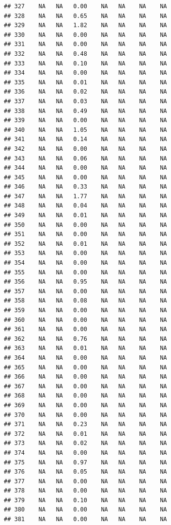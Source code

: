 \documentclass{article}\usepackage{graphicx, color}
\makeatletter
\newenvironment{kframe}{%
 \def\at@end@of@kframe{}%
 \ifinner\ifhmode%
  \def\at@end@of@kframe{\end{minipage}}%
  \begin{minipage}{\columnwidth}%
 \fi\fi%
 \def\FrameCommand##1{\hskip\@totalleftmargin \hskip-\fboxsep
 \colorbox{shadecolor}{##1}\hskip-\fboxsep
     \hskip-\linewidth \hskip-\@totalleftmargin \hskip\columnwidth}%
 \MakeFramed {\advance\hsize-\width
   \@totalleftmargin\z@ \linewidth\hsize
   \@setminipage}}%
 {\par\unskip\endMakeFramed%
 \at@end@of@kframe}
\newenvironment{knitrout}{}{} %
\makeatother
\begin{document}
\begin{knitrout}
\begin{kframe}
\begin{verbatim}
## 327    NA   NA   0.00    NA   NA    NA    NA
## 328    NA   NA   0.65    NA   NA    NA    NA
## 329    NA   NA   1.82    NA   NA    NA    NA
## 330    NA   NA   0.00    NA   NA    NA    NA
## 331    NA   NA   0.00    NA   NA    NA    NA
## 332    NA   NA   0.48    NA   NA    NA    NA
## 333    NA   NA   0.10    NA   NA    NA    NA
## 334    NA   NA   0.00    NA   NA    NA    NA
## 335    NA   NA   0.01    NA   NA    NA    NA
## 336    NA   NA   0.02    NA   NA    NA    NA
## 337    NA   NA   0.03    NA   NA    NA    NA
## 338    NA   NA   0.49    NA   NA    NA    NA
## 339    NA   NA   0.00    NA   NA    NA    NA
## 340    NA   NA   1.05    NA   NA    NA    NA
## 341    NA   NA   0.14    NA   NA    NA    NA
## 342    NA   NA   0.00    NA   NA    NA    NA
## 343    NA   NA   0.06    NA   NA    NA    NA
## 344    NA   NA   0.00    NA   NA    NA    NA
## 345    NA   NA   0.00    NA   NA    NA    NA
## 346    NA   NA   0.33    NA   NA    NA    NA
## 347    NA   NA   1.77    NA   NA    NA    NA
## 348    NA   NA   0.04    NA   NA    NA    NA
## 349    NA   NA   0.01    NA   NA    NA    NA
## 350    NA   NA   0.00    NA   NA    NA    NA
## 351    NA   NA   0.00    NA   NA    NA    NA
## 352    NA   NA   0.01    NA   NA    NA    NA
## 353    NA   NA   0.00    NA   NA    NA    NA
## 354    NA   NA   0.00    NA   NA    NA    NA
## 355    NA   NA   0.00    NA   NA    NA    NA
## 356    NA   NA   0.95    NA   NA    NA    NA
## 357    NA   NA   0.00    NA   NA    NA    NA
## 358    NA   NA   0.08    NA   NA    NA    NA
## 359    NA   NA   0.00    NA   NA    NA    NA
## 360    NA   NA   0.00    NA   NA    NA    NA
## 361    NA   NA   0.00    NA   NA    NA    NA
## 362    NA   NA   0.76    NA   NA    NA    NA
## 363    NA   NA   0.01    NA   NA    NA    NA
## 364    NA   NA   0.00    NA   NA    NA    NA
## 365    NA   NA   0.00    NA   NA    NA    NA
## 366    NA   NA   0.00    NA   NA    NA    NA
## 367    NA   NA   0.00    NA   NA    NA    NA
## 368    NA   NA   0.00    NA   NA    NA    NA
## 369    NA   NA   0.00    NA   NA    NA    NA
## 370    NA   NA   0.00    NA   NA    NA    NA
## 371    NA   NA   0.23    NA   NA    NA    NA
## 372    NA   NA   0.01    NA   NA    NA    NA
## 373    NA   NA   0.02    NA   NA    NA    NA
## 374    NA   NA   0.00    NA   NA    NA    NA
## 375    NA   NA   0.97    NA   NA    NA    NA
## 376    NA   NA   0.05    NA   NA    NA    NA
## 377    NA   NA   0.00    NA   NA    NA    NA
## 378    NA   NA   0.00    NA   NA    NA    NA
## 379    NA   NA   0.10    NA   NA    NA    NA
## 380    NA   NA   0.00    NA   NA    NA    NA
## 381    NA   NA   0.00    NA   NA    NA    NA

\end{verbatim}
\end{kframe}
\end{knitrout}
\end{document}
